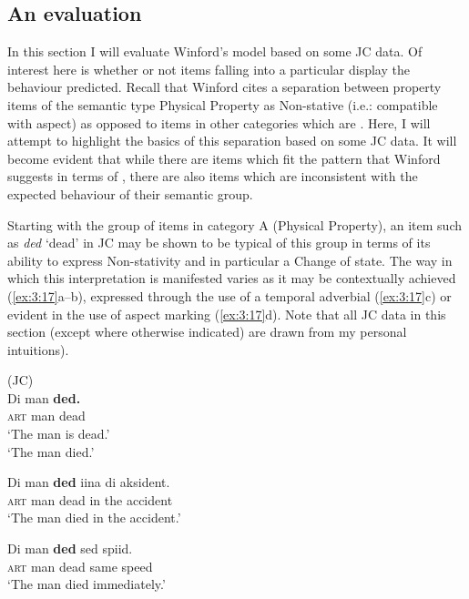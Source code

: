 \subsection{An evaluation}\label{sec:3.3.2}

In this section I will evaluate Winford’s model based on some JC
data. Of interest here is whether or not items falling into a
particular  display the behaviour predicted.  Recall
that Winford cites a separation between property items of the semantic
type Physical Property as Non-stative (i.e.: compatible with
 aspect) as opposed to items in other categories which are
.  Here, I will attempt to highlight the basics of this
separation based on some JC data.  It will become evident that while  there are items which fit the pattern that Winford suggests in terms
of , there are also items which are inconsistent with the
expected behaviour of their semantic group.

Starting with the group of items in category A (Physical Property), an
item such as \textit{ded} `dead' in JC may be shown to be typical of this group in terms of its ability to express Non-stativity and in
particular a Change of state.  The way in which this interpretation is
manifested varies as it may be contextually achieved (\ref{ex:3:17}a--b),
expressed through the use of a temporal adverbial (\ref{ex:3:17}c) or
evident in the use of  aspect marking (\ref{ex:3:17}d).
Note that all JC data in this section (except where otherwise
indicated) are drawn from my personal intuitions).\largerpage[-1]

\ea%
\label{ex:3:17}
  (JC)\\
  \ea
 	 \gll Di man \textbf{ded.}\\
  \textsc{art} man dead        \\
    \ea  `The man is dead.'\\
    \ex  `The man died.'\\
    \z 

  \ex
  \gll Di man \textbf{ded} iina di aksident.\\
\textsc{art} man dead in the accident    \\
  \glt `The man died in the accident.'

  \ex
  \gll Di man \textbf{ded} sed spiid.\\
  \textsc{art} man dead same speed      \\
  \glt `The man died immediately.'

